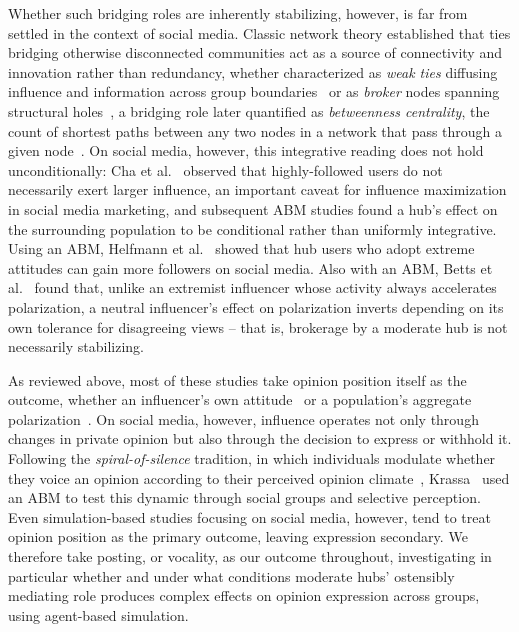 \documentclass{svproc}
\begin{document}
Whether such bridging roles are inherently stabilizing, 
however, is far from settled in the context of social media.
Classic network theory established that ties bridging otherwise
disconnected communities act as a source of connectivity and
innovation rather than redundancy, whether characterized as
\emph{weak ties} diffusing influence and information across group
boundaries~\cite{granovetter1973} or as \emph{broker} nodes spanning
structural holes~\cite{burt1992}, a bridging role later quantified as
\emph{betweenness centrality}, the count of shortest paths between any
two nodes in a network that pass through a given node~\cite{freeman1977}.
On social media, however, this integrative reading does not hold
unconditionally: Cha et
al.~\cite{cha2010} observed that highly-followed users do not
necessarily exert larger influence, an important caveat for influence
maximization in social media marketing, and subsequent ABM studies
found a hub's effect on the surrounding population to be conditional
rather than uniformly integrative. Using an ABM, Helfmann et
al.~\cite{helfm2023} showed that hub users who adopt extreme attitudes
can gain more followers on social media. Also with an ABM, Betts et
al.~\cite{betts2023} found that,
unlike an extremist influencer whose activity always accelerates
polarization, a neutral influencer's effect on polarization inverts
depending on its own tolerance for disagreeing views -- that is,
brokerage by a moderate hub is not necessarily stabilizing.

As reviewed above, most of these studies take opinion position itself
as the outcome, whether an influencer's own attitude~\cite{helfm2023}
or a population's aggregate polarization~\cite{betts2023,sasahara2020}.
On social media, however, influence operates not only through changes
in private opinion but also through the decision to express or
withhold it. Following the \emph{spiral-of-silence} tradition, in
which individuals modulate whether they voice an opinion according to
their perceived opinion climate~\cite{noelle-neumann1974},
Krassa~\cite{krassa1988} used an ABM to test this dynamic through
social groups and selective perception. Even simulation-based studies
focusing on social media, however, tend to treat opinion position as
the primary outcome, leaving expression secondary. We therefore take
posting, or vocality, as our outcome throughout, investigating in
particular whether and under what conditions moderate hubs'
ostensibly mediating role produces complex effects on opinion
expression across groups, using agent-based simulation.
\end{document}
